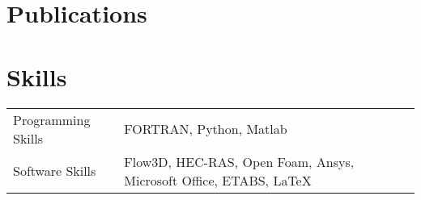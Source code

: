 \documentclass[a4paper,12pt]{article}
\begin{document}
\section{Publications}
\begin{refsection}
\nocite{*}
\printbibliography[heading=none]
\end{refsection}

\section{Skills}
\begin{tabularx}{\linewidth}{@{}l X@{}}
Programming Skills &  \normalsize{FORTRAN, Python, Matlab}\\
Software Skills  &  \normalsize{Flow3D, HEC-RAS, Open Foam, Ansys, Microsoft Office, ETABS,  \LaTeX  }\\ 

\end{tabularx}

\vfill
{}
\end{document}
